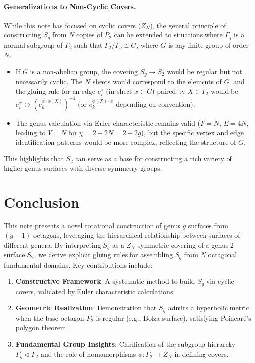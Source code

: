 \documentclass{article}
\theoremstyle{definition}
\theoremstyle{remark}
\begin{document}
\paragraph{Generalizations to Non-Cyclic Covers.}
While this note has focused on cyclic covers ($Z_N$), the general principle of constructing $S_g$ from $N$ copies of $P_2$ can be extended to situations where $\Gamma_g$ is a normal subgroup of $\Gamma_2$ such that $\Gamma_2/\Gamma_g \cong G$, where $G$ is any finite group of order $N$.
\begin{itemize}
    \item If $G$ is a non-abelian group, the covering $S_g \to S_2$ would be regular but not necessarily cyclic. The $N$ sheets would correspond to the elements of $G$, and the gluing rule for an edge $e_i^x$ (in sheet $x \in G$) paired by $X \in \Gamma_2$ would be $e_i^x \leftrightarrow (e_k^{x \cdot \phi(X)})^{-1}$ (or $e_k^{\phi(X) \cdot x}$ depending on convention).
    \item The genus calculation via Euler characteristic remains valid ($F=N$, $E=4N$, leading to $V=N$ for $\chi = 2-2N = 2-2g$), but the specific vertex and edge identification patterns would be more complex, reflecting the structure of $G$.
\end{itemize}
This highlights that $S_2$ can serve as a base for constructing a rich variety of higher genus surfaces with diverse symmetry groups.

\section{Conclusion}
This note presents a novel rotational construction of genus \(g\) surfaces from \((g-1)\) octagons, leveraging the hierarchical relationship between surfaces of different genera. By interpreting \(S_g\) as a \(Z_N\)-symmetric covering of a genus 2 surface \(S_2\), we derive explicit gluing rules for assembling \(S_g\) from \(N\) octagonal fundamental domains. Key contributions include:
\begin{enumerate}
    \item \textbf{Constructive Framework}: A systematic method to build \(S_g\) via cyclic covers, validated by Euler characteristic calculations.
    \item \textbf{Geometric Realization}: Demonstration that \(S_g\) admits a hyperbolic metric when the base octagon \(P_2\) is regular (e.g., Bolza surface), satisfying Poincaré's polygon theorem.
    \item \textbf{Fundamental Group Insights}: Clarification of the subgroup hierarchy \(\Gamma_g \triangleleft \Gamma_2\) and the role of homomorphisms \(\phi: \Gamma_2 \to Z_N\) in defining covers.
\end{enumerate}
\end{document}
